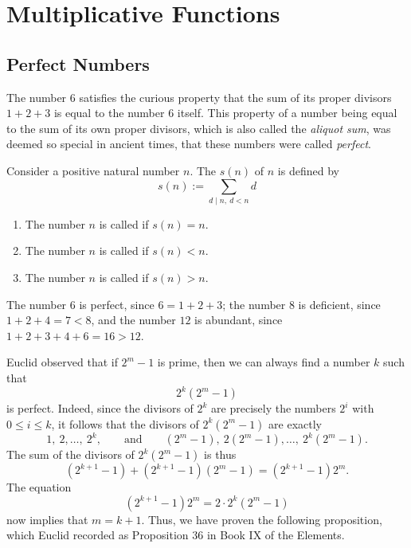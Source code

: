 \chapter{Multiplicative Functions}

\section{Perfect Numbers}

The number $6$ satisfies the curious property that the sum of its proper divisors $1+2+3$ is equal to the number $6$ itself. This property of a number being equal to the sum of its own proper divisors, which is also called the \emph{aliquot sum}, was deemed so special in ancient times, that these numbers were called \emph{perfect}.

\begin{definition}
  Consider a positive natural number $n$. The  $s(n)$ of $n$ is defined by
  \begin{equation*}
    s(n):=\sum_{d\mid n,~d<n}d
  \end{equation*}
  \begin{enumerate}
  \item The number $n$ is called  if $s(n)=n$.
  \item The number $n$ is called  if $s(n)<n$.
  \item The number $n$ is called  if $s(n)>n$.
  \end{enumerate}
\end{definition}

\begin{example}
  The number $6$ is perfect, since $6=1+2+3$; the number $8$ is deficient, since $1+2+4=7<8$, and the number $12$ is abundant, since $1+2+3+4+6=16>12$.
\end{example}

Euclid observed that if $2^m-1$ is prime, then we can always find a number $k$ such that
\begin{equation*}
  2^k(2^m-1)
\end{equation*}
is perfect. Indeed, since the divisors of $2^k$ are precisely the numbers $2^i$ with $0\leq i\leq k$, it follows that the divisors of $2^k(2^m-1)$ are exactly
\begin{equation*}
  1,~2,\ldots,~2^k,\qquad\text{and}\qquad (2^m-1),~2(2^m-1),\ldots,~2^k(2^m-1).
\end{equation*}
The sum of the divisors of $2^k(2^m-1)$ is thus
\begin{equation*}
  (2^{k+1}-1)+(2^{k+1}-1)(2^m-1)=(2^{k+1}-1)2^m.
\end{equation*}
The equation
\begin{equation*}
  (2^{k+1}-1)2^m=2\cdot 2^k(2^m-1)
\end{equation*}
now implies that $m=k+1$. Thus, we have proven the following proposition, which Euclid recorded as Proposition 36 in Book IX of the Elements.

